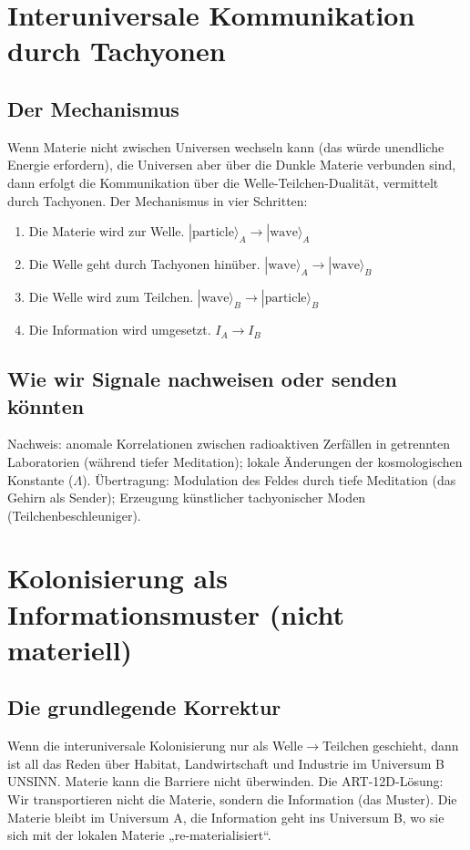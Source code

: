 \section{Interuniversale Kommunikation durch Tachyonen}
\subsection{Der Mechanismus}
Wenn Materie nicht zwischen Universen wechseln kann (das würde unendliche Energie erfordern), die Universen aber über die Dunkle Materie verbunden sind, dann erfolgt die Kommunikation über die Welle-Teilchen-Dualität, vermittelt durch Tachyonen. Der Mechanismus in vier Schritten:
\begin{enumerate}
    \item Die Materie wird zur Welle. $|\text{particle}\rangle_A \to |\text{wave}\rangle_A$
    \item Die Welle geht durch Tachyonen hinüber. $|\text{wave}\rangle_A \to |\text{wave}\rangle_B$
    \item Die Welle wird zum Teilchen. $|\text{wave}\rangle_B \to |\text{particle}\rangle_B$
    \item Die Information wird umgesetzt. $I_A \to I_B$
\end{enumerate}

\subsection{Wie wir Signale nachweisen oder senden könnten}
Nachweis: anomale Korrelationen zwischen radioaktiven Zerfällen in getrennten Laboratorien (während tiefer Meditation); lokale Änderungen der kosmologischen Konstante ($\Lambda$). Übertragung: Modulation des Feldes durch tiefe Meditation (das Gehirn als Sender); Erzeugung künstlicher tachyonischer Moden (Teilchenbeschleuniger).

\section{Kolonisierung als Informationsmuster (nicht materiell)}
\subsection{Die grundlegende Korrektur}
Wenn die interuniversale Kolonisierung nur als Welle$\to$Teilchen geschieht, dann ist all das Reden über Habitat, Landwirtschaft und Industrie im Universum B UNSINN. Materie kann die Barriere nicht überwinden. Die ART-12D-Lösung: Wir transportieren nicht die Materie, sondern die Information (das Muster). Die Materie bleibt im Universum A, die Information geht ins Universum B, wo sie sich mit der lokalen Materie „re-materialisiert``.


